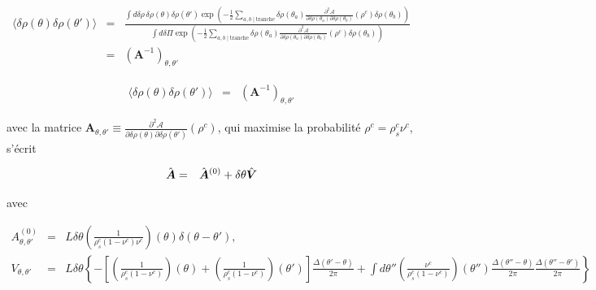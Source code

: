 \begin{eqnarray*}
    \langle \delta \rho ( \theta) \delta \rho ( \theta') \rangle &=&  
    \frac{ \int d\delta \rho \, \delta \rho(\theta) \delta \rho ( \theta') 
    \exp \left( - \frac{1}{2} \sum_{a,b \mid \text{tranche}}  
    \delta \rho(\theta_a) \frac{\partial^2 \mathcal{A}}{\partial \delta \rho(\theta_a) \partial \delta \rho(\theta_b) } (\rho^c)  \delta \rho(\theta_b) \right) }
    { \int d\delta \Pi  
    \exp \left( - \frac{1}{2} \sum_{a,b \mid \text{tranche}}  
    \delta \rho(\theta_a) \frac{\partial^2 \mathcal{A}}{\partial \delta \rho(\theta_a) \partial \delta \rho(\theta_b) } (\rho^c)  \delta \rho(\theta_b) \right) } \\
    &=& \left( \mathbf{A}^{-1} \right)_{\theta , \theta'}
\end{eqnarray*}


\begin{aff}

\begin{eqnarray*}
	\langle \delta \rho ( \theta) \delta \rho ( \theta') \rangle &=& 	\left( \mathbf{A}^{-1} \right)_{\theta , \theta'}
\end{eqnarray*}

	

avec la  matrice $\mathbf{A}_{\theta , \theta'} \equiv \frac{\partial^2 \mathcal{A}}{\partial \delta \rho(\theta) \partial \delta \rho(\theta') }(\rho^c)$, qui maximise la probabilité  $\rho^c=\rho^c_s \nu^c $, s'écrit

\begin{eqnarray*}
	\hat{\bm{A}} & = & \hat{\bm{A}}^{(0)} + \delta \theta \hat{\bm{V}}
\end{eqnarray*}

avec 

\begin{eqnarray*}
	A^{(0)}_{\theta , \theta'}  & = &  L\delta \theta \left ( \frac{ 1}{\rho^c_s ( 1  - \nu^c ) \nu^c } \right )(\theta)    \delta({\theta - \theta '})	,\\
	V_{\theta , \theta'}  &= & L \delta \theta \left \{ - \left [ \left ( \frac{1}{\rho^c_s( 1 - \nu^c) } \right ) ( \theta)  +  \left ( \frac{1}{\rho^c_s( 1 - \nu^c) } \right ) ( \theta' )\right ] \frac{ \Delta( \theta'- \theta )}{ 2 \pi } + \int d\theta''  \left ( \frac{\nu^c}{\rho^c_s( 1 - \nu^c) } \right )(\theta'') \frac{\Delta(\theta''- \theta)}{2 \pi}\frac{\Delta(\theta''- \theta')}{2 \pi}   \right \} 	
\end{eqnarray*}

\end{aff}

